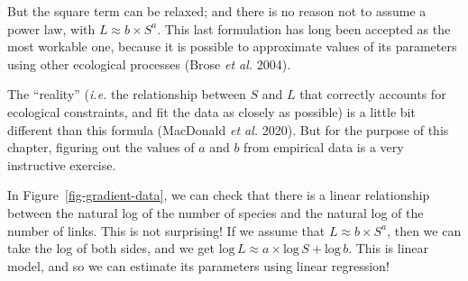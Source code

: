 \documentclass[
  letterpaper,
]{scrbook}
\begin{document}
But the square term can be relaxed; and there is no reason not to assume
a power law, with \(L\approx b\times S^a\). This last formulation has
long been accepted as the most workable one, because it is possible to
approximate values of its parameters using other ecological processes
(Brose \emph{et al.} 2004).

The ``reality'' (\emph{i.e.} the relationship between \(S\) and \(L\)
that correctly accounts for ecological constraints, and fit the data as
closely as possible) is a little bit different than this formula
(MacDonald \emph{et al.} 2020). But for the purpose of this chapter,
figuring out the values of \(a\) and \(b\) from empirical data is a very
instructive exercise.

In Figure~\ref{fig-gradient-data}, we can check that there is a linear
relationship between the natural log of the number of species and the
natural log of the number of links. This is not surprising! If we assume
that \(L \approx b\times S^a\), then we can take the log of both sides,
and we get
\(\text{log}\, L \approx a \times \text{log}\, S + \text{log}\,b\). This
is linear model, and so we can estimate its parameters using linear
regression!

\begin{figure}[bt]



\end{figure}%
\end{document}
